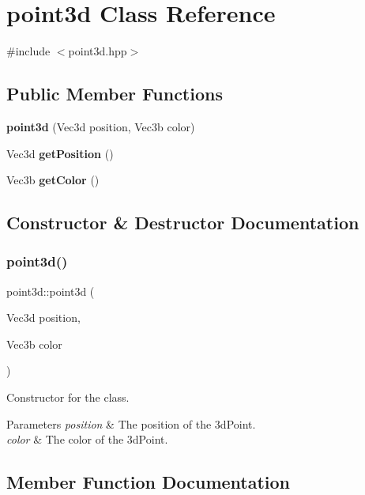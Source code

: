 \section{point3d Class Reference}
\label{classpoint3d}


{\ttfamily \#include $<$point3d.\+hpp$>$}

\subsection*{Public Member Functions}
\begin{DoxyCompactItemize}
\item 
\textbf{ point3d} (Vec3d position, Vec3b color)
\item 
Vec3d \textbf{ get\+Position} ()
\item 
Vec3b \textbf{ get\+Color} ()
\end{DoxyCompactItemize}


\subsection{Constructor \& Destructor Documentation}
\mbox{\label{classpoint3d_a92ab5430456c0738bdc7d8f9f623629a}} 
\subsubsection{point3d()}
{\footnotesize\ttfamily point3d\+::point3d (\begin{DoxyParamCaption}\item[{Vec3d}]{position,  }\item[{Vec3b}]{color }\end{DoxyParamCaption})}

Constructor for the class.


\begin{DoxyParams}{Parameters}
{\em position} & The position of the 3d\+Point. \\
\hline
{\em color} & The color of the 3d\+Point. \\
\hline
\end{DoxyParams}


\subsection{Member Function Documentation}
\mbox{\label{classpoint3d_a133b9989d89645695b71c71a3f67e014}} 
